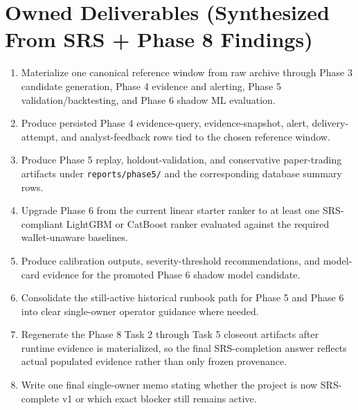 \documentclass{article}
\begin{document}
\section*{Owned Deliverables (Synthesized From SRS + Phase 8 Findings)}
\begin{enumerate}
\item Materialize one canonical reference window from raw archive through Phase 3 candidate generation, Phase 4 evidence and alerting, Phase 5 validation/backtesting, and Phase 6 shadow ML evaluation.
\item Produce persisted Phase 4 evidence-query, evidence-snapshot, alert, delivery-attempt, and analyst-feedback rows tied to the chosen reference window.
\item Produce Phase 5 replay, holdout-validation, and conservative paper-trading artifacts under \texttt{reports/phase5/} and the corresponding database summary rows.
\item Upgrade Phase 6 from the current linear starter ranker to at least one SRS-compliant LightGBM or CatBoost ranker evaluated against the required wallet-unaware baselines.
\item Produce calibration outputs, severity-threshold recommendations, and model-card evidence for the promoted Phase 6 shadow model candidate.
\item Consolidate the still-active historical runbook path for Phase 5 and Phase 6 into clear single-owner operator guidance where needed.
\item Regenerate the Phase 8 Task 2 through Task 5 closeout artifacts after runtime evidence is materialized, so the final SRS-completion answer reflects actual populated evidence rather than only frozen provenance.
\item Write one final single-owner memo stating whether the project is now SRS-complete v1 or which exact blocker still remains active.
\end{enumerate}
\end{document}
